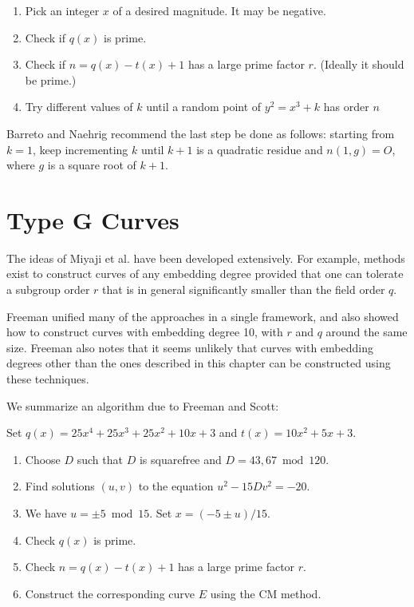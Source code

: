 \begin{enumerate}
\item
Pick an integer $x$ of a desired magnitude. It may be negative.
\item
Check if $q(x)$ is prime.
\item
Check if $n = q(x) - t(x) + 1$ has a large prime factor $r$.
(Ideally it should be prime.)
\item
Try different values of $k$ until a random point of
$y^2 = x^3 + k$ has order $n$
\end{enumerate}

Barreto and Naehrig recommend the last step be done as follows:
starting from $k = 1$, keep incrementing $k$ until $k+1$ is a quadratic
residue and $n(1,g) = O$, where $g$ is a square root of $k + 1$.

\section {Type G Curves}

The ideas of Miyaji et al. have been developed extensively\cite{alotofstuff}.
For example, methods exist to construct curves of any embedding degree
provided that one can tolerate a subgroup order $r$ that is
in general significantly smaller than the field order $q$.

Freeman unified many of the approaches in a single
framework\cite{freeman06}, and also showed how to construct curves with
embedding degree 10, with $r$ and $q$ around the same size.
Freeman also notes that it seems unlikely that curves
with embedding degrees other than the ones described in this chapter
can be constructed using these techniques.

We summarize an algorithm due to Freeman and Scott:

Set $q(x) = 25x^4 + 25x^3 + 25x^2 + 10x + 3$ and
$t(x) = 10x^2 + 5x + 3$.

\begin{enumerate}
\item
Choose $D$ such that $D$ is squarefree and $D = 43, 67 \bmod 120$.
\item
Find solutions $(u,v)$ to the equation $u^2 - 15 Dv^2 = -20$.
\item
We have $u = \pm 5 \bmod 15$.
Set $x = (-5 \pm u)/15$.
\item
Check $q(x)$ is prime.
\item
Check $n = q(x) - t(x) + 1$ has a large prime factor $r$.
\item
Construct the corresponding curve $E$ using the CM method.
\end{enumerate}

